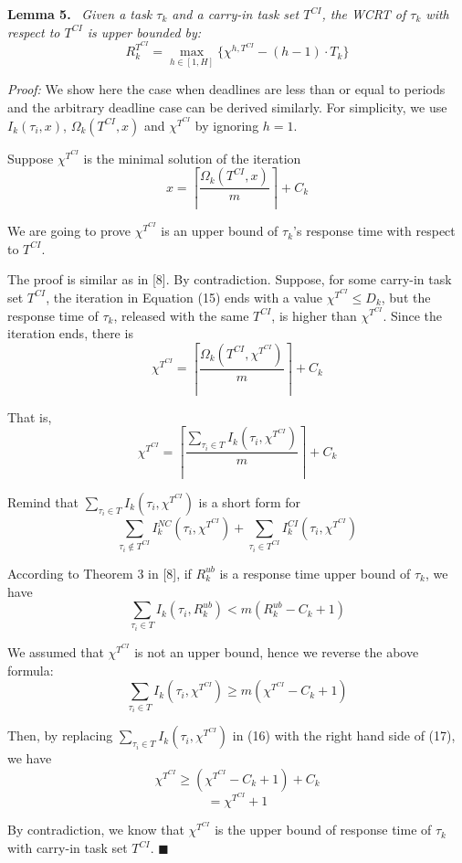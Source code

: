 \textbf{Lemma 5.} \ \textit{Given a task $\tau_k$ and a carry-in task set $T^{CI}$, the WCRT of $\tau_k$ with respect to $T^{CI}$ is upper bounded by:}
\[
R_k^{T^{CI}}=\max_{h\in[1,H]}\{\chi^{h,T^{CI}}-(h-1)\cdot T_k\}
\tag{14}
\]

\textit{Proof:} We show here the case when deadlines are less than or equal to periods and the arbitrary deadline case can be derived similarly. For simplicity, we use $I_k(\tau_i,x)$, $\Omega_k(T^{CI},x)$ and $\chi^{T^{CI}}$ by ignoring $h=1$.

Suppose $\chi^{T^{CI}}$ is the minimal solution of the iteration
\[
x=\left\lceil \frac{\Omega_k(T^{CI},x)}{m} \right\rceil + C_k
\tag{15}
\]

We are going to prove $\chi^{T^{CI}}$ is an upper bound of $\tau_k$'s response time with respect to $T^{CI}$.

The proof is similar as in [8]. By contradiction. Suppose, for some carry-in task set $T^{CI}$, the iteration in Equation (15) ends with a value $\chi^{T^{CI}} \leq D_k$, but the response time of $\tau_k$, released with the same $T^{CI}$, is higher than $\chi^{T^{CI}}$. Since the iteration ends, there is
\[
\chi^{T^{CI}}=\left\lceil \frac{\Omega_k(T^{CI},\chi^{T^{CI}})}{m} \right\rceil + C_k
\]

That is,
\[
\chi^{T^{CI}}=
\left\lceil
\frac{\sum_{\tau_i\in T} I_k(\tau_i,\chi^{T^{CI}})}{m}
\right\rceil
+ C_k
\tag{16}
\]

Remind that $\sum_{\tau_i\in T} I_k(\tau_i,\chi^{T^{CI}})$ is a short form for
\[
\sum_{\tau_i\notin T^{CI}} I_k^{NC}(\tau_i,\chi^{T^{CI}})
+
\sum_{\tau_i\in T^{CI}} I_k^{CI}(\tau_i,\chi^{T^{CI}})
\]

According to Theorem 3 in [8], if $R_k^{ub}$ is a response time upper bound of $\tau_k$, we have
\[
\sum_{\tau_i\in T} I_k(\tau_i,R_k^{ub}) < m(R_k^{ub}-C_k+1)
\]

We assumed that $\chi^{T^{CI}}$ is not an upper bound, hence we reverse the above formula:
\[
\sum_{\tau_i\in T} I_k(\tau_i,\chi^{T^{CI}}) \geq m(\chi^{T^{CI}}-C_k+1)
\tag{17}
\]

Then, by replacing $\sum_{\tau_i\in T} I_k(\tau_i,\chi^{T^{CI}})$ in (16) with the right hand side of (17), we have
\[
\chi^{T^{CI}} \geq (\chi^{T^{CI}}-C_k+1)+C_k
\]
\[
= \chi^{T^{CI}}+1
\]

By contradiction, we know that $\chi^{T^{CI}}$ is the upper bound of response time of $\tau_k$ with carry-in task set $T^{CI}$. \hfill $\blacksquare$